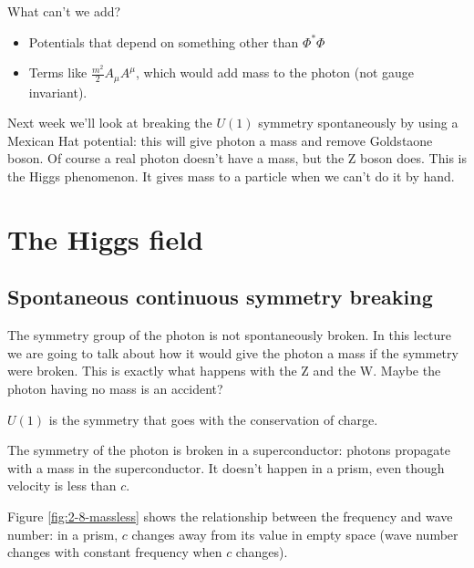 \documentclass[]{article}
\begin{document}
What can't we add?

\begin{itemize}
	\item Potentials that depend on something other than $\Phi^*\Phi$ 
	\item Terms like $\frac{m^2}{2}A_\mu A^\mu$, which would add mass to the photon (not gauge invariant).
\end{itemize}

Next week we'll look at breaking the $U(1)$ symmetry spontaneously by using a Mexican Hat potential: this will give photon a mass and remove Goldstaone boson. Of course a real photon doesn't have a mass, but the Z boson does. This is the Higgs phenomenon. It gives mass to a particle when we can't do it by hand.

\section{The Higgs field}

\subsection{Spontaneous continuous symmetry breaking}
The symmetry group of the photon is not spontaneously broken. In this lecture we are going to talk about how it would give the photon a mass if the symmetry were broken. This is exactly what happens with the Z and the W. Maybe the photon having no mass is an accident?

$U(1)$ is the symmetry that goes with the conservation of charge.

The symmetry of the photon is broken in a superconductor: photons propagate with a mass in the superconductor. It doesn't happen in a prism, even though velocity is less than $c$.

Figure \ref{fig:2-8-massless} shows the relationship between the frequency and wave number: in a prism, $c$ changes away from its value in empty space (wave number changes with constant frequency when $c$ changes). 
\end{document}
